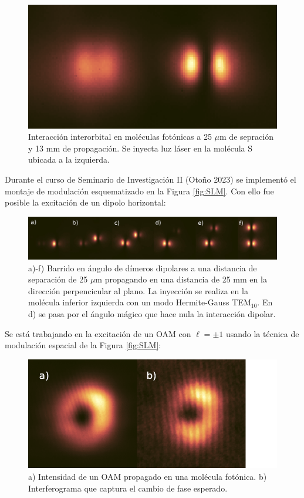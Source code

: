 \documentclass{article}
\begin{document}
\begin{figure}[H]
	\centering
	\includegraphics[width=0.5\linewidth]{./media/SPinteraction.png}
	\caption{Interacción interorbital en moléculas fotónicas a 25 $\mu$m de sepración y 13 mm de propagación. Se inyecta luz láser en la molécula S ubicada a la izquierda.}
\end{figure}

Durante el curso de Seminario de Investigación II (Otoño 2023) se implementó el montaje de modulación esquematizado en la Figura \ref{fig:SLM}. Con ello fue posible la excitación de un dipolo horizontal:

\begin{figure}[H]
	\centering
	\includegraphics[width=1.0\linewidth]{./media/dipoles.jpg}
	\caption{a)-f) Barrido en ángulo de dímeros dipolares a una distancia de separación de 25 $\mu$m propagando en una distancia de 25 mm en la dirección perpencicular al plano. La inyección se realiza en la molécula inferior izquierda con un modo Hermite-Gauss TEM$_{10}$. En d) se pasa por el ángulo mágico que hace nula la interacción dipolar.}
\end{figure}

Se está trabajando en la excitación de un OAM con $\ell = \pm 1$ usando la técnica de modulación espacial de la Figura \ref{fig:SLM}:

\begin{figure}[H]
	\centering
	\includegraphics[width=0.7\linewidth]{./media/vortex.png}
	\caption{a) Intensidad de un OAM propagado en una molécula fotónica. b) Interferograma que captura el cambio de fase esperado.}
\end{figure} 
\end{document}
